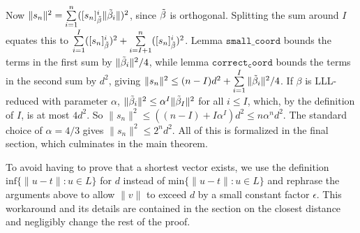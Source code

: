 \documentclass[11pt,a4paper]{article}
\begin{document}
Now $\|s_n\|^2 = \sum\limits_{i=1}^n ([s_n]_{\Tilde{\beta}}^i\|\Tilde{\beta}_i\|)^2$, since $\Tilde{\beta}$ is orthogonal.
Splitting the sum around $I$ equates this to $\sum\limits_{i=1}^I ([s_n]_{\Tilde{\beta}}^i)^2+\sum\limits_{i=I+1}^n ([s_n]_{\Tilde{\beta}}^i)^2$.
Lemma $\mathtt{small\_coord}$ bounds the terms in the first sum by $\|\Tilde{\beta}_i\|^2/4$, while lemma $\mathtt{correct_coord}$
bounds the terms in the second sum by $d^2$, giving $\|s_n\|^2\leq (n-I)d^2+\sum\limits_{i=1}^I \|\Tilde{\beta}_i\|^2/4$.
If $\beta$ is LLL-reduced with parameter $\alpha$, $\|\Tilde{\beta}_i\|^2\leq \alpha^I \|\Tilde{\beta}_I\|^2$ for all $i\leq I$,
which, by the definition of $I$, is at most $4d^2$. So $\|s_n\|^2\leq ((n-I)+I\alpha^I)d^2\leq n\alpha^nd^2$.
The standard choice of $\alpha=4/3$ gives $\|s_n\|^2\leq 2^nd^2$. All of this is formalized in the final
section, which culminates in the main theorem.

To avoid having to prove that a shortest vector exists, we use the definition $\text{inf}\{\|u-t\|:u\in L\}$
for $d$ instead of $\text{min}\{\|u-t\|:u\in L\}$ and rephrase the arguments above to allow $\|v\|$ to
exceed $d$ by a small constant factor $\epsilon$. This workaround and its details are contained in the section 
on the closest distance and negligibly change the rest of the proof.
\\ \\





\end{document}
